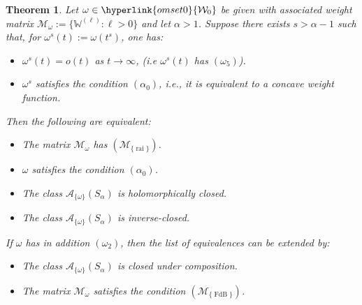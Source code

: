 \documentclass[11pt,a4paper]{article}
\theoremstyle{plain}
\newtheorem{theorem}[proposition]{Theorem}
\theoremstyle{definition}
\let\on=\operatorname
\begin{document}
\begin{theorem}\label{theoremWeightFunctionWideSector}
Let $\omega\in\hyperlink{omset0}{\mathcal{W}_0}$ be given with associated weight matrix $\mathcal{M}_{\omega}:=\{\mathbb{W}^{(\ell)}: \ell>0\}$ and let $\alpha> 1$. Suppose there exists $s > \alpha -1$ such that, for $\omega^s(t):=\omega(t^s)$, one has:\begin{itemize}
    \item[(i)]  $\omega^s(t) = o(t)$ as $t\to\infty$, (i.e $\omega^s(t)$ has $(\omega_5)$).
    \item[(ii)]  $\omega^s$ satisfies the condition $(\alpha_0)$, i.e., it is
 equivalent to a concave weight function.
\end{itemize}
%
Then the following are equivalent:
	\begin{itemize}
		\item[$(a)$] The matrix $\mathcal{M}_{\omega}$ has \hyperlink{R-rai}{$(\mathcal{M}_{\{\on{rai}\}})$}.

		\item[$(b)$] $\omega$ satisfies the condition $(\alpha_0)$.
		
		\item[$(c)$] The class $\mathcal{A}_{\{\omega\}}(S_{\alpha})$ is holomorphically closed.
		
		\item[$(d)$] The class $\mathcal{A}_{\{\omega\}}(S_{\alpha})$ is inverse-closed.
  \end{itemize}
	If $\omega$ has in addition $(\omega_2)$, then the list of equivalences can be extended by:

 \begin{itemize}
		\item[$(e)$] The class $\mathcal{A}_{\{\omega\}}(S_{\alpha})$ is closed under composition.
		
		\item[$(f)$] The matrix $\mathcal{M}_{\omega}$ satisfies the condition \hyperlink{R-FdB}{$(\mathcal{M}_{\{\on{FdB}\}})$}.
\end{itemize}	
\end{theorem}
\end{document}
